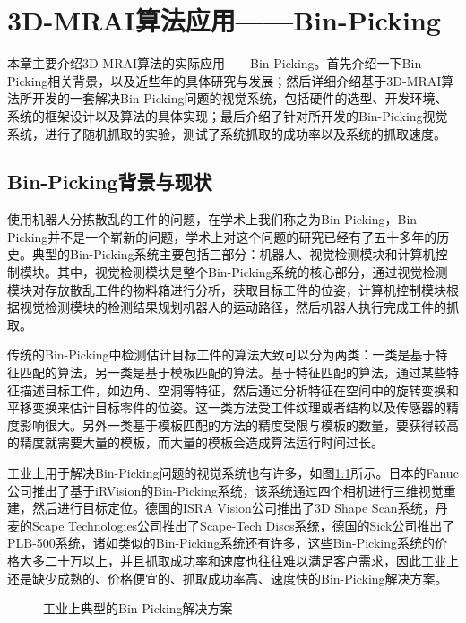 \chapter{3D-MRAI算法应用——Bin-Picking}
\label{chap:app}
本章主要介绍3D-MRAI算法的实际应用——Bin-Picking。首先介绍一下Bin-Picking相关背景，以及近些年的具体研究与发展；然后详细介绍基于3D-MRAI算法所开发的一套解决Bin-Picking问题的视觉系统，包括硬件的选型、开发环境、系统的框架设计以及算法的具体实现；最后介绍了针对所开发的Bin-Picking视觉系统，进行了随机抓取的实验，测试了系统抓取的成功率以及系统的抓取速度。

\section{Bin-Picking背景与现状}
使用机器人分拣散乱的工件的问题，在学术上我们称之为Bin-Picking，Bin-Picking并不是一个崭新的问题，学术上对这个问题的研究已经有了五十多年的历史。典型的Bin-Picking系统主要包括三部分：机器人、视觉检测模块和计算机控制模块。其中，视觉检测模块是整个Bin-Picking系统的核心部分，通过视觉检测模块对存放散乱工件的物料箱进行分析，获取目标工件的位姿，计算机控制模块根据视觉检测模块的检测结果规划机器人的运动路径，然后机器人执行完成工件的抓取。

传统的Bin-Picking中检测估计目标工件的算法大致可以分为两类：一类是基于特征匹配的算法，另一类是基于模板匹配的算法。基于特征匹配的算法，通过某些特征描述目标工件，如边角、空洞等特征，然后通过分析特征在空间中的旋转变换和平移变换来估计目标零件的位姿。这一类方法受工件纹理或者结构以及传感器的精度影响很大。另外一类基于模板匹配的方法的精度受限与模板的数量，要获得较高的精度就需要大量的模板，而大量的模板会造成算法运行时间过长。

工业上用于解决Bin-Picking问题的视觉系统也有许多，如图\ref{fig:bin-picking-sys}所示。日本的Fanuc公司推出了基于iRVision的Bin-Picking系统，该系统通过四个相机进行三维视觉重建，然后进行目标定位\cite{connolly2007new}。德国的ISRA Vision公司推出了3D Shape Scan系统，丹麦的Scape Technologies公司推出了Scape-Tech Discs系统，德国的Sick公司推出了PLB-500系统，诸如类似的Bin-Picking系统还有许多，这些Bin-Picking系统的价格大多二十万以上，并且抓取成功率和速度也往往难以满足客户需求，因此工业上还是缺少成熟的、价格便宜的、抓取成功率高、速度快的Bin-Picking解决方案。
\begin{figure}[ht]
  \centering
  \hskip1.5cm
  \vfill
  \hskip1.5cm
  \caption{工业上典型的Bin-Picking解决方案}
  \label{fig:bin-picking-sys}
\end{figure}

